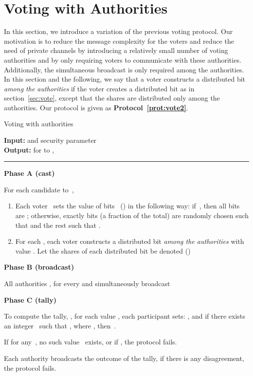 \documentclass[runningheads]{llncs}
\begin{document}
\section{Voting with Authorities}
\label{sec:votewithauthorities}

In this section, we introduce a variation of the previous  voting
protocol. Our motivation is to reduce the message complexity for the
voters and reduce the need of private channels by introducing a
relatively small number of voting authorities and by only requiring
voters to communicate with these authorities. Additionally, the
simultaneous broadcast is only required among the authorities. In
this section and the following, we say that a voter constructs a
distributed bit \emph{among the authorities} if the voter creates a
distributed bit as in section~\ref{sec:vote}, except that the shares
are distributed only among the authorities. Our protocol is given as
\textbf{Protocol~\ref{prot:vote2}}.

\begin{protocol}[h]
\caption{Voting with authorities} \label{prot:vote2}

{\bf Input:} 
and security parameter  \\
{\bf Output:} for  to , 

\vspace{4pt} \hrule \vspace{4pt}

\textbf{Phase A (cast)}

For each candidate  to~, \vspace{-.25cm}
\begin{enumerate}
\item \label{step:flip-1}
Each voter~ sets the value of  bits~ () in the following way: if~, then all bits
are ; otherwise, exactly  bits (a fraction  of the
total) are randomly chosen such that  and the rest such
that .

\item \label{step:parity}
For each , each voter  constructs a
distributed bit \emph{among the authorities} with value .
Let the shares of each distributed bit be denoted 
()
\end{enumerate}

\textbf{Phase B (broadcast)}

All authorities , for every  and  simultaneously
broadcast 

\textbf{Phase C (tally)}

To compute the tally, , for each value , each
participant sets: \mbox{},
\mbox{} and  if
there exists an integer~ such that , where , then \,.

If for any~, no such value~ exists, or if , the protocol fails.

Each authority broadcasts the outcome of the tally,
if there is any disagreement, the protocol fails.

\end{protocol}
\end{document}
